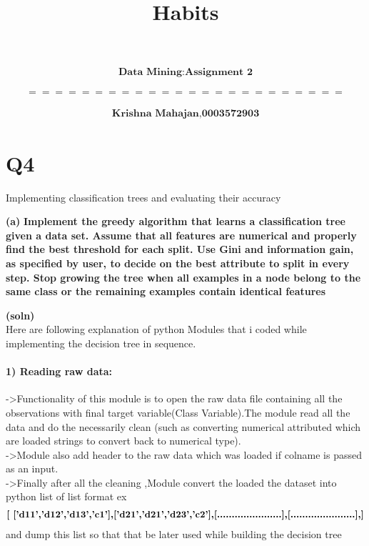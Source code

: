 \documentclass[]{article}
\title{Habits}
\author{}
\date{}
\begin{document}
\maketitle


\[  
\begin{aligned}  
\textbf{Data Mining:Assignment 2}  
\end{aligned}
\]

\[  
\begin{aligned}
========================
\end{aligned}
\]

\[  
\begin{aligned} 
\textbf{Krishna Mahajan,0003572903}   
\end{aligned}
\]

\section{Q4}\label{q4}

Implementing classification trees and evaluating their accuracy

\textbf{(a)} \textbf{Implement the greedy algorithm that learns a
classification tree given a data set. Assume that all features are
numerical and properly find the best threshold for each split. Use Gini
and information gain, as specified by user, to decide on the best
attribute to split in every step. Stop growing the tree when all
examples in a node belong to the same class or the remaining examples
contain identical features}

\textbf{(soln)}\\Here are following explanation of python Modules that i
coded while implementing the decision tree in sequence.

\paragraph{1) Reading raw data:}\label{reading-raw-data}

-\textgreater{}Functionality of this module is to open the raw data file
containing all the observations with final target variable(Class
Variable).The module read all the data and do the necessarily clean
(such as converting numerical attributed which are loaded strings to
convert back to numerical type).\\-\textgreater{}Module also add header
to the raw data which was loaded if colname is passed as an
input.\\-\textgreater{}Finally after all the cleaning ,Module convert
the loaded the dataset into python list of list format ex\\\[ 
\begin{aligned} 
 \textbf{[      
 ['d11','d12','d13','c1'],\newline   
 ['d21','d21','d23','c2'],\newline    
 [......................],\newline    
 [......................],\newline    
 ]}   
\end{aligned}
\] and dump this list so that that be later used while building the
decision tree
\end{document}
